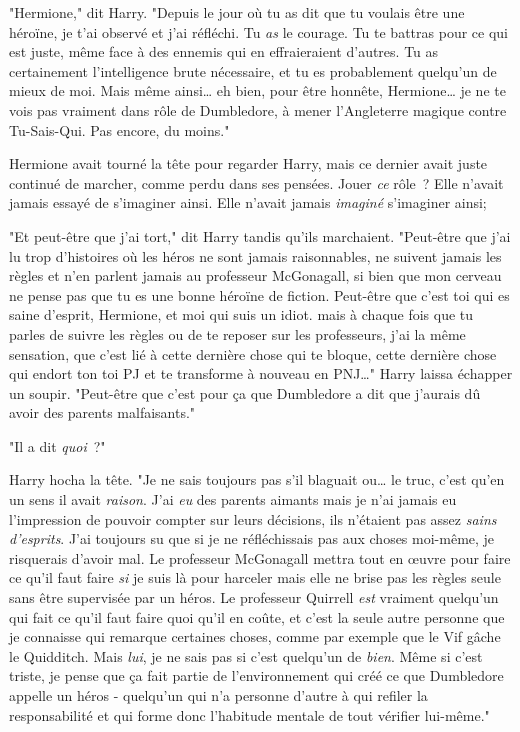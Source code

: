 "Hermione," dit Harry. "Depuis le jour où tu as dit que tu voulais être une héroïne, je t'ai observé et j'ai réfléchi. Tu \emph{as} le courage. Tu te battras pour ce qui est juste, même face à des ennemis qui en effraieraient d'autres. Tu as certainement l'intelligence brute nécessaire, et tu es probablement quelqu'un de mieux de moi. Mais même ainsi… eh bien, pour être honnête, Hermione… je ne te vois pas vraiment dans rôle de Dumbledore, à mener l'Angleterre magique contre Tu-Sais-Qui. Pas encore, du moins."

Hermione avait tourné la tête pour regarder Harry, mais ce dernier avait juste continué de marcher, comme perdu dans ses pensées. Jouer \emph{ce} rôle~? Elle n'avait jamais essayé de s'imaginer ainsi. Elle n'avait jamais \emph{imaginé} s'imaginer ainsi;

"Et peut-être que j'ai tort," dit Harry tandis qu'ils marchaient. "Peut-être que j'ai lu trop d'histoires où les héros ne sont jamais raisonnables, ne suivent jamais les règles et n'en parlent jamais au professeur McGonagall, si bien que mon cerveau ne pense pas que tu es une bonne héroïne de fiction. Peut-être que c'est toi qui es saine d'esprit, Hermione, et moi qui suis un idiot. mais à chaque fois que tu parles de suivre les règles ou de te reposer sur les professeurs, j'ai la même sensation, que c'est lié à cette dernière chose qui te bloque, cette dernière chose qui endort ton toi PJ et te transforme à nouveau en PNJ…" Harry laissa échapper un soupir. "Peut-être que c'est pour ça que Dumbledore a dit que j'aurais dû avoir des parents malfaisants."

"Il a dit \emph{quoi}~?"

Harry hocha la tête. "Je ne sais toujours pas s'il blaguait ou… le truc, c'est qu'en un sens il avait \emph{raison}. J'ai \emph{eu} des parents aimants mais je n'ai jamais eu l'impression de pouvoir compter sur leurs décisions, ils n'étaient pas assez \emph{sains d'esprits}. J'ai toujours su que si je ne réfléchissais pas aux choses moi-même, je risquerais d'avoir mal. Le professeur McGonagall mettra tout en œuvre pour faire ce qu'il faut faire \emph{si} je suis là pour harceler mais elle ne brise pas les règles seule sans être supervisée par un héros. Le professeur Quirrell \emph{est} vraiment quelqu'un qui fait ce qu'il faut faire quoi qu'il en coûte, et c'est la seule autre personne que je connaisse qui remarque certaines choses, comme par exemple que le Vif gâche le Quidditch. Mais \emph{lui}, je ne sais pas si c'est quelqu'un de \emph{bien}. Même si c'est triste, je pense que ça fait partie de l'environnement qui créé ce que Dumbledore appelle un héros - quelqu'un qui n'a personne d'autre à qui refiler la responsabilité et qui forme donc l'habitude mentale de tout vérifier lui-même."

